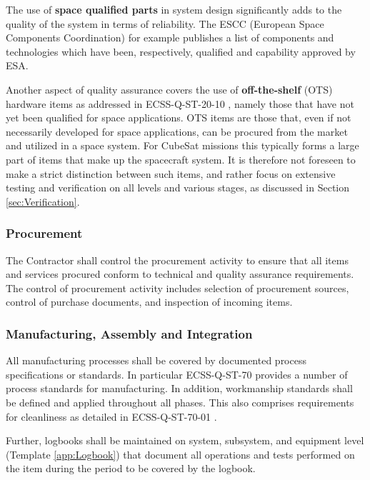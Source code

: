 The use of \textbf{space qualified parts} in system design significantly adds to the quality of the system in terms of reliability. The ESCC (European Space Components Coordination) for example publishes a list of components and technologies which have been, respectively, qualified and capability approved by ESA. \cite{spacecomponents.org}

Another aspect of quality assurance covers the use of \textbf{off-the-shelf} (OTS) hardware items as addressed in ECSS-Q-ST-20-10 \cite{ECSS-Q-ST-20-10}, namely those that have not yet been qualified for space applications. OTS items are those that, even if not necessarily developed for space applications, can be procured from the market and utilized in a space system. For CubeSat missions this typically forms a large part of items that make up the spacecraft system. It is therefore not foreseen to make a strict distinction between such items, and rather focus on extensive testing and verification on all levels and various stages, as discussed in Section \ref{sec:Verification}.

\subsubsection{Procurement}

The Contractor shall control the procurement activity to ensure that all items and services
procured conform to technical and quality assurance requirements. The control of procurement activity includes selection of procurement sources, control of purchase documents, and inspection of incoming items.

\subsubsection{Manufacturing, Assembly and Integration}

All manufacturing processes shall be covered by documented process specifications or standards. In particular ECSS-Q-ST-70 \cite{ECSS-Q-ST-70} provides a number of process standards for manufacturing. In addition, workmanship standards shall be defined and applied throughout all phases. This also comprises requirements for cleanliness as detailed in ECSS-Q-ST-70-01 \cite{ECSS-Q-ST-70-01}.

Further, logbooks shall be maintained on system, subsystem, and equipment level (Template \ref{app:Logbook}) that document all operations and tests performed on the item during the period to be covered by the logbook.

